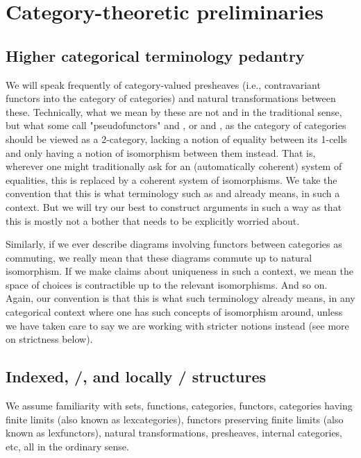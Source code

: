 \section{Category-theoretic preliminaries}

\subsection{Higher categorical terminology pedantry}
We will speak frequently of category-valued presheaves (i.e., contravariant functors into the category of categories) and natural transformations between these. Technically, what we mean by these are not  and  in the traditional sense, but what some call "pseudofunctors" and , or  and , as the category of categories should be viewed as a 2-category, lacking a notion of equality between its 1-cells and only having a notion of isomorphism between them instead. That is, wherever one might traditionally ask for an (automatically coherent) system of equalities, this is replaced by a coherent system of isomorphisms. We take the convention that this is what terminology such as  and  already means, in such a context. But we will try our best to construct arguments in such a way as that this is mostly not a bother that needs to be explicitly worried about.

Similarly, if we ever describe diagrams involving functors between categories as commuting, we really mean that these diagrams commute up to natural isomorphism. If we make claims about uniqueness in such a context, we mean the space of choices is contractible up to the relevant isomorphisms. And so on. Again, our convention is that this is what such terminology already means, in any categorical context where one has such concepts of isomorphism around, unless we have taken care to say we are working with stricter notions instead (see more on strictness below).

\subsection{Indexed, \repsmall/, and locally \repsmall/ structures}
We assume familiarity with sets, functions, categories, functors, categories having finite limits (also known as lexcategories), functors preserving finite limits (also known as lexfunctors), natural transformations, presheaves, internal categories, etc, all in the ordinary sense.

